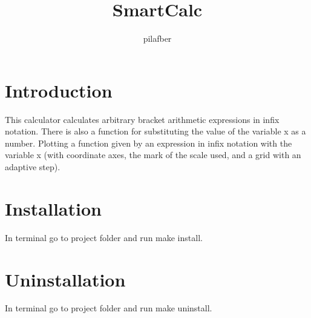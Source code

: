 \documentclass{article}
\title{SmartCalc}
\author{pilafber}
\begin{document}
\maketitle

\section{Introduction}

This calculator calculates arbitrary bracket arithmetic expressions in infix notation. There is also a function for substituting the value of the variable x as a number.
Plotting a function given by an expression in infix notation with the variable x (with coordinate axes, the mark of the scale used, and a grid with an adaptive step).

\section{Installation}

In terminal go to project folder and run make install.

\section{Uninstallation}

In terminal go to project folder and run make uninstall.
\end{document}
